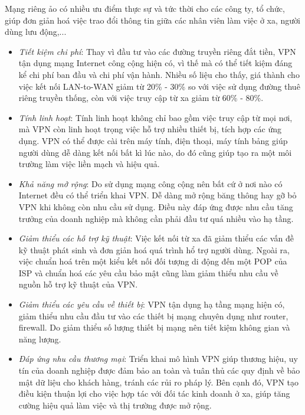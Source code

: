     Mạng riêng ảo có nhiều ưu điểm thực sự và tức thời cho các công ty, tổ chức, giúp đơn giản hoá việc trao đổi thông tin giữa các nhân viên làm việc ở xa, người dùng lưu động,...
    \begin{itemize}
        \item \textit{Tiết kiệm chi phí}: Thay vì đầu tư vào các đường truyền riêng đắt tiền, VPN tận dụng mạng Internet công cộng hiện có, vì thế mà có thể tiết kiệm đáng kể chi phí ban đầu và chi phí vận hành. Nhiều số liệu cho thấy, giá thành cho việc kết nối LAN-to-WAN giảm từ 20\% - 30\% so với việc sử dụng đường thuê riêng truyền thống, còn với việc truy cập từ xa giảm từ 60\% - 80\%.
        \item \textit{Tính linh hoạt}: Tính linh hoạt không chỉ bao gồm việc truy cập từ mọi nơi, mà VPN còn linh hoạt trọng việc hỗ trợ nhiều thiết bị, tích hợp các ứng dụng. VPN có thể được cài trên máy tính, điện thoại, máy tính bảng giúp người dùng dễ dàng kết nối bất kì lúc nào, do đó cũng giúp tạo ra một môi trường làm việc liền mạch và hiệu quả.
        \item \textit{Khả năng mở rộng}: Do sử dụng mạng công cộng nên bất cứ ở nơi nào có Internet đều có thể triển khai VPN. Dễ dàng mở rộng băng thông hay gỡ bỏ VPN khi không còn nhu cầu sử dụng. Điều này đáp ứng được nhu cầu tăng trưởng của doanh nghiệp mà không cần phải đầu tư quá nhiều vào hạ tầng.
        \item \textit{Giảm thiểu các hỗ trợ kỹ thuật}: Việc kết nối từ xa đã giảm thiểu các vấn đề kỹ thuật phát sinh và đơn giản hoá quá trình hổ trợ người dùng. Ngoài ra, việc chuẩn hoá trên một kiểu kết nối đối tượng di động đến một POP của ISP và chuẩn hoá các yêu cầu bảo mật cũng làm giảm thiểu nhu cầu về nguồn hỗ trợ kỹ thuật của VPN.
        \item \textit{Giảm thiểu các yêu cầu về thiết bị}: VPN tận dụng hạ tầng mạng hiện có, giảm thiểu nhu cầu đầu tư vào các thiết bị mạng chuyên dụng như router, firewall. Do giảm thiểu số lượng thiết bị mạng nên tiết kiệm không gian và năng lượng. 
        \item \textit{Đáp ứng nhu cầu thương mại}: Triển khai mô hình VPN giúp thương hiệu, uy tín của doanh nghiệp được đảm bảo an toàn và tuân thủ các quy định về bảo mật dữ liệu cho khách hàng, tránh các rủi ro pháp lý. Bên cạnh đó, VPN tạo điều kiện thuận lợi cho việc hợp tác với đối tác kinh doanh ở xa, giúp tăng cường hiệu quả làm việc và thị trường được mở rộng.
    \end{itemize}
    
